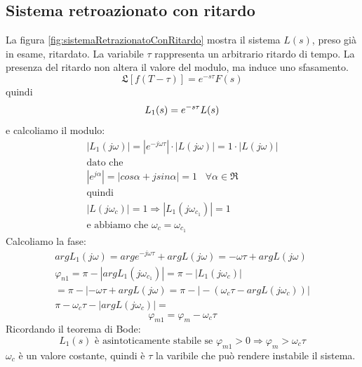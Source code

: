 \documentclass[a4paper]{report}
\begin{document}
\subsection{Sistema retroazionato con ritardo}

La figura \ref{fig:sistemaRetrazionatoConRitardo} mostra il sistema
$L(s)$, preso gi\`a in esame, ritardato. La variabile $\tau$
rappresenta un arbitrario ritardo di tempo. La presenza del ritardo
non altera il valore del modulo, ma induce uno sfasamento.
\[
\mathfrak{L}[f(T - \tau)] = e^{-s \tau} F(s)
\]
quindi
\[
L_1(s) = e^{-s \tau} L(s)\\
\]
e calcoliamo il modulo:
\[
\begin{array}{l}
  |L_1(j \omega)| = |e^{-j \omega \tau}| \cdot |L(j \omega)| = 1 \cdot
  |L(j \omega)|\\
  \textrm{dato che}\\
  |e^{j \alpha}| = |cos \alpha + j sin \alpha| = 1 \;\;\; \forall \alpha \in
  \mathfrak{R}\\
  \textrm{quindi}\\
  |L(j \omega_c)| = 1 \Rightarrow |L_1(j \omega_{c_{1}})| = 1\\
  \textrm{e abbiamo che } \omega_c = \omega_{c_{1}}
\end{array}
\]
Calcoliamo la fase:
\[
\begin{array}{l}
  arg L_1(j \omega) = arg e^{-j \omega \tau} + arg L(j \omega) =
  -\omega \tau + arg L(j \omega)\\
  \varphi_{n1} = \pi - |arg L_1(j \omega_{c_{1}})| = \pi - |L_1(j
  \omega_c)|\\
  = \pi - | - \omega \tau + arg L(j \omega) = \pi - | - (\omega_c \tau
  - arg L(j \omega_c))|\\
  \pi - \omega_c \tau - |arg L(j \omega_c)| =
\end{array}
\]
\begin{equation}
  \varphi_{m1} = \varphi_m - \omega_c \tau
\end{equation}
Ricordando il teorema di Bode:
\[
L_1(s) \textrm{ \`e asintoticamente stabile se } \varphi_{m1} > 0
\Rightarrow \varphi_m > \omega_c \tau
\]
$\omega_c$ \`e un valore costante, quindi \`e $\tau$ la varibile che
pu\`o rendere instabile il sistema.
\end{document}

